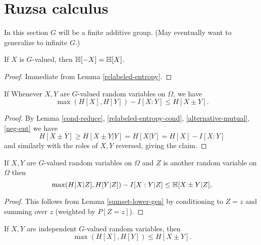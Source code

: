 \chapter{Ruzsa calculus}

In this section $G$ will be a finite additive group.  (May eventually want to generalize to infinite $G$.)

\begin{lemma}\label{neg-ent}
  If $X$ is $G$-valued, then $\mathbb{H}[-X]=\mathbb{H}[X]$.
\end{lemma}

\begin{proof} Immediate from Lemma \ref{relabeled-entropy}.
\end{proof}

\begin{lemma}\label{sumset-lower-gen}
  If
Whenever $X,Y$ are $G$-valued random variables on $\Omega$, we have
$$ \max(H[X], H[Y]) - I[X:Y] \leq H[X \pm Y].$$
\end{lemma}

\begin{proof}   By Lemma \ref{cond-reduce}, \ref{relabeled-entropy-cond}, \ref{alternative-mutual}, \ref{neg-ent} we have
$$
 H[X\pm Y] \geq H[X\pm Y|Y] = H[X|Y]= H[X] - I[X:Y]
$$
and similarly with the roles of $X,Y$ reversed, giving the claim.
\end{proof}

\begin{corollary}\label{sumset-lower-gen-cond}
  If $X,Y$ are $G$-valued random variables on $\Omega$ and $Z$ is another random variable on $\Omega$ then
\[
  \max(H[X|Z], H[Y|Z]) - I[X:Y|Z] \leq \mathbb{H}[X\pm Y|Z],
\]
\end{corollary}

\begin{proof}  This follows from Lemma \ref{sumset-lower-gen} by conditioning to $Z = z$ and summing over $z$ (weighted by $P[Z=z]$).
\end{proof}

\begin{corollary}\label{sumset-lower}
  If $X,Y$ are independent $G$-valued random variables, then
$$\max(H[X], H[Y]) \leq H[X\pm Y].
$$
\end{corollary}

